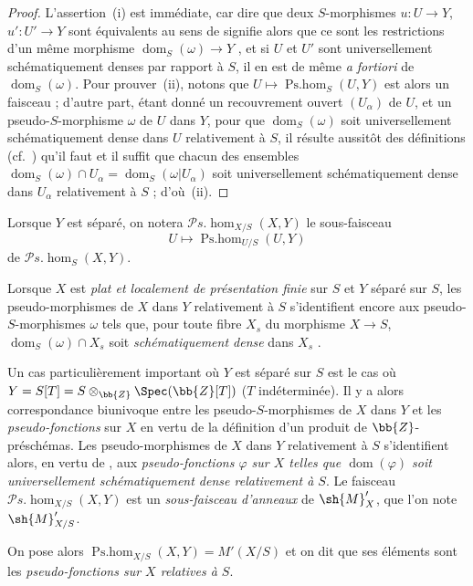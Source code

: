 \begin{proof}
L'assertion~(i) est immédiate, car dire que deux $S$-morphismes $u:U\to Y$, $u':U'\to Y$ sont équivalents au sens de  signifie alors que ce sont les restrictions d'un même morphisme $\operatorname{dom}_S(\omega)\to Y$ , et si $U$ et $U'$ sont universellement schématiquement denses par rapport à $S$, il en est de même \emph{a fortiori} de $\operatorname{dom}_S(\omega)$.
Pour prouver~(ii), notons que $U\mapsto\operatorname{Ps.hom}_S(U,Y)$ est alors un faisceau  ; d'autre part, étant donné un recouvrement ouvert $(U_\alpha)$ de $U$, et un pseudo-$S$-morphisme $\omega$ de $U$ dans $Y$, pour que $\operatorname{dom}_S(\omega)$ soit universellement schématiquement dense dans $U$ relativement à $S$, il résulte aussitôt des définitions (cf.\ ) qu'il faut et il suffit que chacun des ensembles $\operatorname{dom}_S(\omega)\cap U_\alpha=\operatorname{dom}_S(\omega|U_\alpha)$ soit universellement schématiquement dense dans $U_\alpha$ relativement à $S$ ; d'où~(ii).
\end{proof}

Lorsque $Y$ est séparé, on notera $\mathscr{P}\!s.\!\operatorname{hom}_{X/S}(X,Y)$ le sous-faisceau
\[
  U\mapsto\operatorname{Ps.hom}_{U/S}(U,Y)
\]
de $\mathscr{P}\!s.\!\operatorname{hom}_S(X,Y)$.

Lorsque $X$ est \emph{plat et localement de présentation finie} sur $S$ et $Y$ séparé sur $S$, les pseudo-morphismes de $X$ dans $Y$ relativement à $S$ s'identifient encore aux pseudo-$S$-morphismes $\omega$ tels que, pour toute fibre $X_s$ du morphisme $X\to S$, $\operatorname{dom}_S(\omega)\cap X_s$ soit \emph{schématiquement dense} dans $X_s$ .

\begin{env}[20.5.4]
Un cas particulièrement important où $Y$ est séparé sur $S$ est le cas où $Y=S[T]=S\otimes_{\bb{Z}}\Spec(\bb{Z}[T])$ ($T$ indéterminée).
Il y a alors correspondance biunivoque entre les pseudo-$S$-morphismes de $X$ dans $Y$ et les \emph{pseudo-fonctions} sur $X$  en vertu de la définition d'un produit de $\bb{Z}$-préschémas.
Les pseudo-morphismes de $X$ dans $Y$ relativement à $S$ s'identifient alors, en vertu de , aux \emph{pseudo-fonctions $\varphi$ sur $X$ telles que $\operatorname{dom}(\varphi)$ soit universellement schématiquement dense relativement à $S$}.
Le faisceau $\mathscr{P}\!s.\!\operatorname{hom}_{X/S}(X,Y)$ est un \emph{sous-faisceau d'anneaux} de $\sh{M}'_X$, que l'on note $\sh{M}'_{X/S}$.

On pose alors $\operatorname{Ps.hom}_{X/S}(X,Y)=M'(X/S)$ et on dit que ses éléments sont les \emph{pseudo-fonctions sur $X$ relatives à $S$}.
\end{env}


